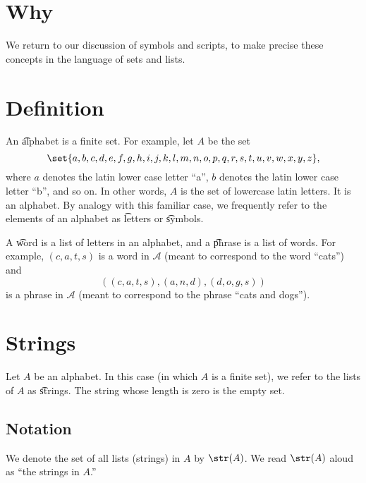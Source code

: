 

\section*{Why}

We return to our discussion of symbols and scripts, to make precise these concepts in the language of sets and lists.

\section*{Definition}

An \t{alphabet} is a finite set.
For example, let $A$ be the set
\[
\set{a, b, c, d, e, f,g,h,i,j,k,l,m,n,o,p,q,r,s,t,u,v,w, x, y,z},
\]
where $a$ denotes the latin lower case letter ``a'', $b$ denotes the latin lower case letter ``b'', and so on.
In other words, $A$ is the set of lowercase latin letters.
It is an alphabet.
By analogy with this familiar case, we frequently refer to the elements of an alphabet as \t{letters} or \t{symbols}.

A \t{word} is a list of letters in an alphabet, and a \t{phrase} is a list of words.
For example, $(c,a,t,s)$ is a word in $\mathcal{A} $ (meant to correspond to the word ``cats'') and
\[
((c,a,t,s), (a,n,d), (d,o,g,s))
\]
is a phrase in $\mathcal{A} $ (meant to correspond to the phrase ``cats and dogs'').

\section*{Strings}

Let $A$ be an alphabet.
In this case (in which $A$ is a finite set), we refer to the lists of $A$ as \t{strings}.
The string whose length is zero is the empty set.

\subsection*{Notation}

We denote the set of all lists (strings) in $A$ by $\str(A)$.
We read $\str(A)$ aloud as ``the strings in $A$.''
